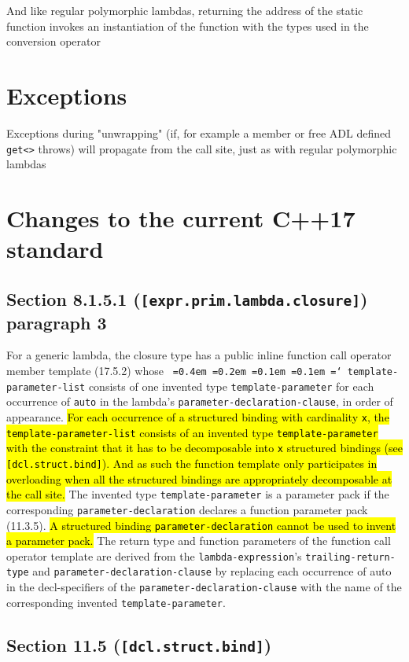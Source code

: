 \documentclass{article}
\DeclareRobustCommand{\hlgreen}[1]{{\sethlcolor{green}\hl{#1}}}
\newcommand*\justify{%
  \fontdimen2\font=0.4em%
  \fontdimen3\font=0.2em%
  \fontdimen4\font=0.1em%
  \fontdimen7\font=0.1em%
  \hyphenchar\font=`\-%
}
\begin{document}
And like regular polymorphic lambdas, returning the address of the static
function invokes an instantiation of the function with the types used in the
conversion operator

\section{Exceptions}
Exceptions during "unwrapping" (if, for example a member or free ADL defined
\texttt{get<>} throws) will propagate from the call site, just as with regular
polymorphic lambdas


\newpage
\section{Changes to the current C++17 standard}
\subsection{Section 8.1.5.1 (\texttt{[expr.prim.lambda.closure]}) paragraph 3}

For a generic lambda, the closure type has a public inline function call
operator member template (17.5.2) whose \texttt{\justify template-parameter-list}
consists of one invented type \texttt{template-parameter} for each occurrence
of \texttt{auto} in the lambda’s \texttt{parameter-declaration-clause}, in
order of appearance.  \hlgreen{For each occurrence of a structured binding with
cardinality \texttt{x}, the \texttt{template-parameter-list} consists of an
invented type \texttt{template-parameter} with the constraint that it has to
be decomposable into \texttt{x} structured bindings (see
\texttt{[dcl.struct.bind]}).  And as such the function template only
participates in overloading when all the structured bindings are appropriately
decomposable at the call site.} The invented type \texttt{template-parameter}
is a parameter pack if the corresponding \texttt{parameter-declaration}
declares a function parameter pack (11.3.5).  \hlgreen{A structured binding
\texttt{parameter-declaration} cannot be used to invent a parameter pack.} The
return type and function parameters of the function call operator template are
derived from the \texttt{lambda-expression}’s \texttt{trailing-return-type}
and \texttt{parameter-declaration-clause} by replacing each occurrence of auto
in the decl-specifiers of the \texttt{parameter-declaration-clause} with the
name of the corresponding invented \texttt{template-parameter}.


\subsection{Section 11.5 (\texttt{[dcl.struct.bind]})}
\end{document}
